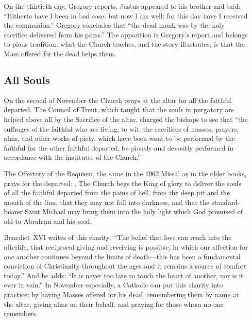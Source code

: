 On the thirtieth day, Gregory reports, Justus appeared to his brother and said: ``Hitherto have I been in bad case, but now I am well; for this day have I received the communion.'' Gregory concludes that ``the dead monk was by the holy sacrifice delivered from his pains.'' The apparition is Gregory's report and belongs to pious tradition; what the Church teaches, and the story illustrates, is that the Mass offered for the dead helps them.

\subsection{All Souls}

On the second of November the Church prays at the altar for all the faithful departed. The Council of Trent, which taught that the souls in purgatory are helped above all by the Sacrifice of the altar, charged the bishops to see that ``the suffrages of the faithful who are living, to wit, the sacrifices of masses, prayers, alms, and other works of piety, which have been wont to be performed by the faithful for the other faithful departed, be piously and devoutly performed in accordance with the institutes of the Church.''

The Offertory of the Requiem, the same in the 1962 Missal as in the older books, prays for the departed: . The Church begs the King of glory to deliver the souls of all the faithful departed from the pains of hell, from the deep pit and the mouth of the lion, that they may not fall into darkness, and that the standard-bearer Saint Michael may bring them into the holy light which God promised of old to Abraham and his seed.

Benedict~XVI writes of this charity: ``The belief that love can reach into the afterlife, that reciprocal giving and receiving is possible, in which our affection for one another continues beyond the limits of death---this has been a fundamental conviction of Christianity throughout the ages and it remains a source of comfort today.'' And he adds: ``It is never too late to touch the heart of another, nor is it ever in vain.'' In November especially, a Catholic can put this charity into practice: by having Masses offered for his dead, remembering them by name at the altar, giving alms on their behalf, and praying for those whom no one remembers.
